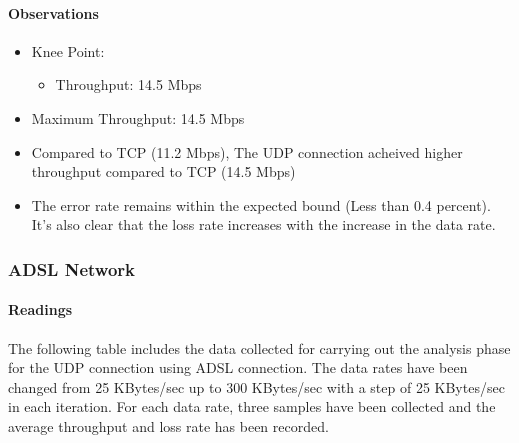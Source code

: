 \documentclass[aps,letterpaper,10pt]{revtex4}
\begin{document}
            \paragraph{Observations}
                \begin{itemize}
                        \item Knee Point:
                            \begin{itemize}
                                \item Throughput: 14.5 Mbps
                            \end{itemize}
                        \item Maximum Throughput: 14.5 Mbps
                        \item Compared to TCP (11.2 Mbps), The UDP connection acheived higher throughput compared to TCP (14.5 Mbps)
                        \item The error rate remains within the expected bound (Less than 0.4 percent). It's also clear that the loss rate increases with the increase in the data rate.
                \end{itemize}
        \newpage
        \subsubsection{ADSL Network}
            \paragraph{Readings}
                The following table includes the data collected for carrying out the analysis phase for the UDP connection using ADSL connection. The data rates have been changed from 25 KBytes/sec up to 300 KBytes/sec with a step of 25 KBytes/sec in each iteration. For each data rate, three samples have been collected and the average throughput and loss rate has been recorded.
                \begin{figure}[htp]
                        \begin{center}
                        \end{center}    
                \end{figure}            
\end{document}
